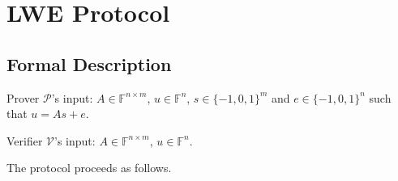 






\section{LWE Protocol}

\subsection{Formal Description}

Prover $\mathcal{P}$'s input: $A \in \mathbb{F}^{n \times m}$, $u \in \mathbb{F}^{n}$, $s \in \{-1, 0, 1\}^{m}$ and $e \in \{-1, 0, 1\}^{n}$ such that $u = As + e$.

Verifier $\mathcal{V}$'s input: $A \in \mathbb{F}^{n \times m}$, $u \in \mathbb{F}^{n}$.

The protocol proceeds as follows.



